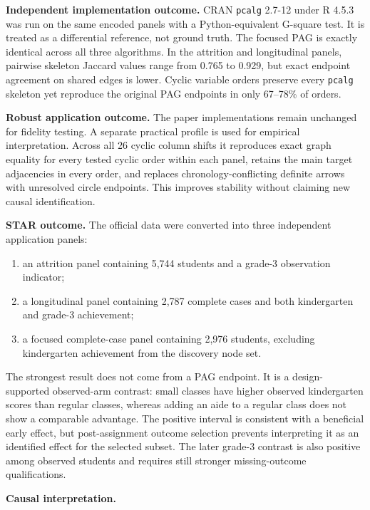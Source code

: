 \documentclass[11pt,a4paper,oneside]{report}
\newcommand{\code}[1]{\texttt{#1}}
\begin{document}
\textbf{Independent implementation outcome.} CRAN \code{pcalg} 2.7-12 under
R 4.5.3 was run on the same encoded panels with a Python-equivalent G-square
test. It is treated as a differential reference, not ground truth. The focused
PAG is exactly identical across all three algorithms. In the attrition and
longitudinal panels, pairwise skeleton Jaccard values range from 0.765 to
0.929, but exact endpoint agreement on shared edges is lower. Cyclic variable
orders preserve every \code{pcalg} skeleton yet reproduce the original PAG
endpoints in only 67--78\% of orders.

\textbf{Robust application outcome.} The paper implementations remain
unchanged for fidelity testing. A separate practical profile is used for
empirical interpretation. Across all 26 cyclic column shifts it reproduces
exact graph equality for every tested cyclic order within each panel, retains
the main target adjacencies in every order, and replaces
chronology-conflicting definite arrows with unresolved circle endpoints. This
improves stability without claiming new causal identification.

\textbf{STAR outcome.} The official data were converted into three independent
application panels:

\begin{enumerate}[leftmargin=2em]
  \item an attrition panel containing 5,744 students and a grade-3 observation
        indicator;
  \item a longitudinal panel containing 2,787 complete cases and both
        kindergarten and grade-3 achievement;
  \item a focused complete-case panel containing 2,976 students, excluding
        kindergarten achievement from the discovery node set.
\end{enumerate}

The strongest result does not come from a PAG endpoint. It is a
design-supported observed-arm contrast: small classes have higher observed
kindergarten scores than regular classes, whereas adding an aide to a regular
class does not show a comparable advantage. The positive interval is
consistent with a beneficial early effect, but post-assignment outcome
selection prevents interpreting it as an identified effect for the selected
subset. The later grade-3 contrast is also positive among observed students
and requires still stronger missing-outcome qualifications.

\textbf{Causal interpretation.}
\end{document}
